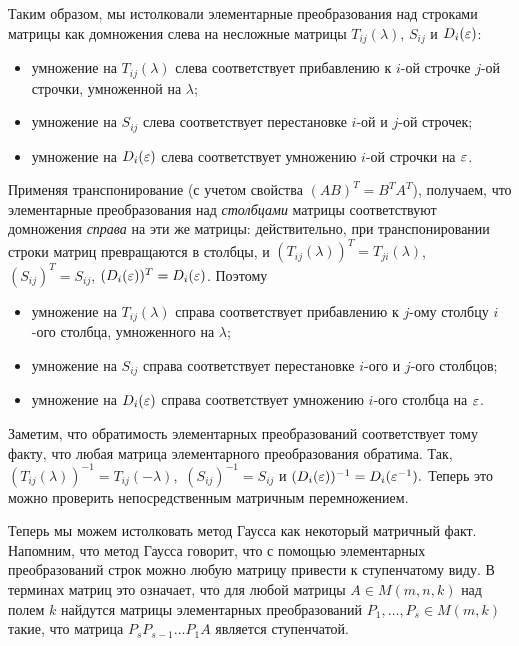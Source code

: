 Таким образом, мы истолковали элементарные преобразования над строками
матрицы как домножения слева на несложные матрицы $T_{ij}(\lambda)$,
$S_{ij}$ и $D_i(\varepsilon)$:
\begin{itemize}
\item умножение на $T_{ij}(\lambda)$ слева соответствует прибавлению к
  $i$-ой строчке $j$-ой строчки, умноженной на $\lambda$;
\item умножение на $S_{ij}$ слева соответствует перестановке $i$-ой и
  $j$-ой строчек;
\item умножение на $D_i(\varepsilon)$ слева соответствует умножению $i$-ой
  строчки на $\varepsilon$.
\end{itemize}
 Применяя транспонирование (с учетом свойства
$(AB)^T=B^TA^T$), получаем, что элементарные преобразования над {\it
  столбцами} матрицы соответствуют домножения {\it справа} на эти же
матрицы: действительно, при транспонировании строки матриц
превращаются в столбцы, и $(T_{ij}(\lambda))^T=T_{ji}(\lambda)$,
$(S_{ij})^T=S_{ij}$, $(D_i(\varepsilon))^T=D_i(\varepsilon)$. Поэтому
\begin{itemize}
\item умножение на $T_{ij}(\lambda)$ справа соответствует прибавлению к
  $j$-ому столбцу $i$-ого столбца, умноженного на $\lambda$;
\item умножение на $S_{ij}$ справа соответствует перестановке $i$-ого и
  $j$-ого столбцов;
\item умножение на $D_i(\varepsilon)$ справа соответствует умножению $i$-ого
  столбца на $\varepsilon$.
\end{itemize}
Заметим, что обратимость элементарных преобразований соответствует
тому факту, что любая матрица элементарного преобразования
обратима. Так, $(T_{ij}(\lambda))^{-1}=T_{ij}(-\lambda),$
$(S_{ij})^{-1}=S_{ij}$ и $(D_i(\varepsilon))^{-1}=D_i(\varepsilon^{-1}).$ Теперь это
можно проверить непосредственным матричным перемножением.

Теперь мы можем истолковать метод Гаусса как некоторый матричный
факт. Напомним, что метод Гаусса говорит, что с помощью элементарных
преобразований строк можно любую матрицу привести к ступенчатому
виду. В терминах матриц это означает, что для любой матрицы $A\in
M(m,n,k)$ над полем $k$ найдутся матрицы
элементарных преобразований $P_1,\dots,P_s\in M(m,k)$ такие, что
матрица $P_sP_{s-1}\dots P_1A$ является ступенчатой.


